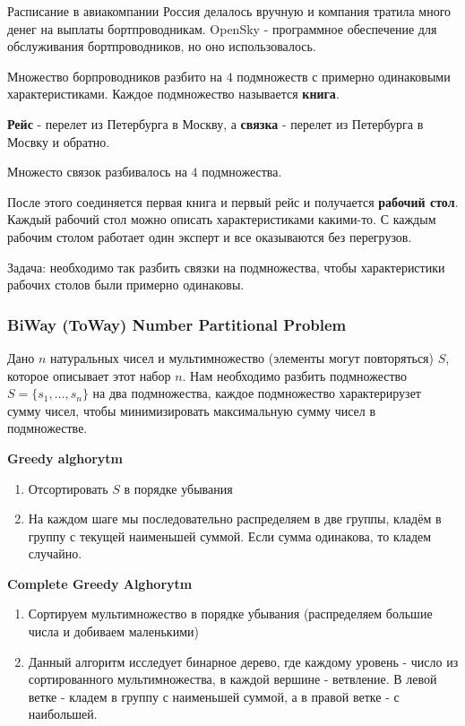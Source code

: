 \documentclass[%
10pt, %
final, %
oneside, %
onecolumn, %
centertags]{article} %
\theoremstyle{plain}
\theoremstyle{definition}
\theoremstyle{remark}
\begin{document}
Расписание в авиакомпании Россия делалось вручную и компания тратила много денег на выплаты бортпроводникам. OpenSky - программное обеспечение для обслуживания бортпроводников, но оно использовалось.

Множество борпроводников разбито на $4$ подмножеств с примерно одинаковыми характеристиками. Каждое подмножество называется \textbf{книга}.

\textbf{Рейс} - перелет из Петербурга в Москву, а \textbf{связка} - перелет из Петербурга в Мосвку и обратно. 

Множесто связок разбивалось на $4$ подмножества.

После этого соединяется первая книга и первый рейс и получается \textbf{рабочий стол}. Каждый рабочий стол можно описать характеристиками какими-то. С каждым рабочим столом работает один эксперт и все оказываются без перегрузов.

Задача: необходимо так разбить связки на подмножества, чтобы характеристики рабочих столов были примерно одинаковы.

\subsubsection{BiWay (ToWay) Number Partitional Problem}

Дано $n$ натуральных чисел и мультимножество (элементы могут повторяться) $S$, которое описывает этот набор $n$. Нам необходимо разбить подмножество $S=\{s_1,\ldots,s_n\}$ на два подмножества, каждое подмножество характерирузет сумму чисел, чтобы минимизировать максимальную сумму чисел в подмножестве.

\textbf{Greedy alghorytm}

\begin{enumerate}
	\item Отсортировать $S$ в порядке убывания
	\item На каждом шаге мы последовательно распределяем в две группы, кладём в группу с текущей наименьшей суммой. Если сумма одинакова, то кладем случайно.
\end{enumerate}

\textbf{Complete Greedy Alghorytm}

\begin{enumerate}
	\item Сортируем мультимножество в порядке убывания (распределяем большие числа и добиваем маленькими)
	\item Данный алгоритм исследует бинарное дерево, где каждому уровень - число из сортированного мультимножества, в каждой вершине - ветвление. В левой ветке - кладем в группу с наименьшей суммой, а в правой ветке - с наибольшей.
\end{enumerate}
\end{document}
